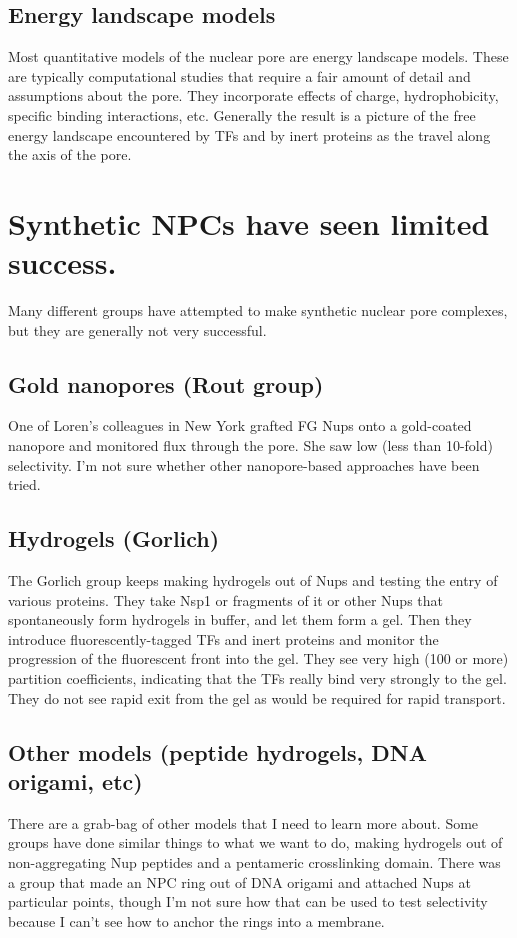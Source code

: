 \subsection{Energy landscape models}
Most quantitative models of the nuclear pore are energy landscape models.  These are typically computational studies that require a fair amount of detail and assumptions about the pore.  They incorporate effects of charge, hydrophobicity, specific binding interactions, etc.  Generally the result is a picture of the free energy landscape encountered by TFs and by inert proteins as the travel along the axis of the pore.
\section{Synthetic NPCs have seen limited success.}
Many different groups have attempted to make synthetic nuclear pore complexes, but they are generally not very successful.
\subsection{Gold nanopores (Rout group)}
One of Loren's colleagues in New York grafted FG Nups onto a gold-coated nanopore and monitored flux through the pore.  She saw low (less than 10-fold) selectivity.  I'm not sure whether other nanopore-based approaches have been tried.
\subsection{Hydrogels (Gorlich)}
The Gorlich group keeps making hydrogels out of Nups and testing the entry of various proteins.  They take Nsp1 or fragments of it or other Nups that spontaneously form hydrogels in buffer, and let them form a gel.  Then they introduce fluorescently-tagged TFs and inert proteins and monitor the progression of the fluorescent front into the gel.  They see very high (100 or more) partition coefficients, indicating that the TFs really bind very strongly to the gel.  They do not see rapid exit from the gel as would be required for rapid transport.
\subsection{Other models (peptide hydrogels, DNA origami, etc)}
There are a grab-bag of other models that I need to learn more about.  Some groups have done similar things to what we want to do, making hydrogels out of non-aggregating Nup peptides and a pentameric crosslinking domain.  There was a group that made an NPC ring out of DNA origami and attached Nups at particular points, though I'm not sure how that can be used to test selectivity because I can't see how to anchor the rings into a membrane.

